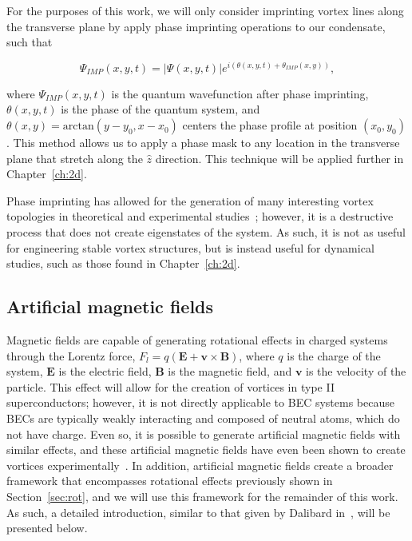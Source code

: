For the purposes of this work, we will only consider imprinting vortex lines along the transverse plane by apply phase imprinting operations to our condensate, such that

\begin{equation}
\Psi_{IMP}(x,y,t) = |\Psi(x,y,t)|e^{i(\theta(x,y,t) + \theta_{IMP}(x,y))},
\end{equation}

\noindent where $\Psi_{IMP}(x,y,t)$ is the quantum wavefunction after phase imprinting, $\theta(x,y,t)$ is the phase of the quantum system, and $\theta(x,y) = \text{arctan}(y-y_0, x-x_0)$ centers the phase profile at position $(x_0, y_0)$.
This method allows us to apply a phase mask to any location in the transverse plane that stretch along the $\hat z$ direction.
This technique will be applied further in Chapter~\ref{ch:2d}.

Phase imprinting has allowed for the generation of many interesting vortex topologies in theoretical and experimental studies~\cite{white2014, maucher2016}; however, it is a destructive process that does not create eigenstates of the system.
As such, it is not as useful for engineering stable vortex structures, but is instead useful for dynamical studies, such as those found in Chapter~\ref{ch:2d}.

\subsection{Artificial magnetic fields}
\label{sec:gauge}

Magnetic fields are capable of generating rotational effects in charged systems through the Lorentz force, $F_l = q(\mathbf{E} + \mathbf{v} \times \mathbf{B})$, where $q$ is the charge of the system, $\mathbf{E}$ is the electric field, $\mathbf{B}$ is the magnetic field, and $\mathbf{v}$ is the velocity of the particle.
This effect will allow for the creation of vortices in type II superconductors; however, it is not directly applicable to BEC systems because BECs are typically weakly interacting and composed of neutral atoms, which do not have charge.
Even so, it is possible to generate artificial magnetic fields with similar effects, and these artificial magnetic fields have even been shown to create vortices experimentally~\cite{lin2009}.
In addition, artificial magnetic fields create a broader framework that encompasses rotational effects previously shown in Section~\ref{sec:rot}, and we will use this framework for the remainder of this work.
As such, a detailed introduction, similar to that given by Dalibard in~\cite{dalibard2015}, will be presented below.

